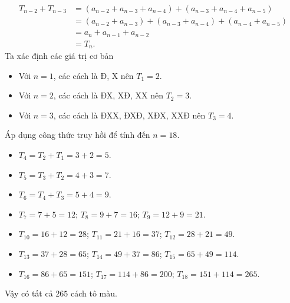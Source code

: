 \begin{ex}
{\begin{align*}
			T_{n-2} + T_{n-3} &= (a_{n-2} + a_{n-3} + a_{n-4}) + (a_{n-3} + a_{n-4} + a_{n-5}) \\ 
			&= (a_{n-2} + a_{n-3}) + (a_{n-3} + a_{n-4}) + (a_{n-4} + a_{n-5}) \\ 
			&= a_n + a_{n-1} + a_{n-2} \\ 
			&= T_n.
		\end{align*}
		Ta xác định các giá trị cơ bản
		\begin{itemize}
			\item Với $n=1$, các cách là Đ, X nên $ T_1 = 2$.
			\item Với $n=2$, các cách là ĐX, XĐ, XX nên $ T_2 = 3$.
			\item Với $n=3$, các cách là ĐXX, ĐXĐ, XĐX, XXĐ nên $ T_3 = 4$.
		\end{itemize}
		Áp dụng công thức truy hồi để tính đến $n=18$.
		\begin{itemize}
			\item $T_4 = T_2 + T_1 = 3 + 2 = 5$.
			\item $T_5 = T_3 + T_2 = 4 + 3 = 7$.
			\item $T_6 = T_4 + T_3 = 5 + 4 = 9$.
			\item $T_7 = 7 + 5 = 12$; $T_8 = 9 + 7 = 16$; $T_9 = 12 + 9 = 21$.
			\item $T_{10} = 16 + 12 = 28$; $T_{11} = 21 + 16 = 37$; $T_{12} = 28 + 21 = 49$.
			\item $T_{13} = 37 + 28 = 65$; $T_{14} = 49 + 37 = 86$; $T_{15} = 65 + 49 = 114$.
			\item $T_{16} = 86 + 65 = 151$; $T_{17} = 114 + 86 = 200$; $T_{18} = 151 + 114 = 265$.
		\end{itemize}
		Vậy có tất cả $265$ cách tô màu.
	}
\end{ex}
\newpage
{}
\label{B\thedeso}